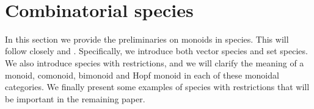 \documentclass[12pt, reqno]{amsart}
\theoremstyle{definition}
\newcommand{\oPi}{\mathbf{C}}
\newcommand{\opi}{\vec{\boldsymbol{\pi}}}
\begin{document}
%
%
%
%
%
%
%
%
%
%
%



\
\section{Combinatorial species\label{sec:species}}


In this section we provide the preliminaries on monoids in species.
This will follow closely \cite{AM2010} and \cite{Schmitt1993}.
Specifically, we introduce both vector species and set species.
We also introduce species with restrictions, and we will clarify the meaning of a monoid, comonoid, bimonoid and Hopf monoid in each of these monoidal categories.
We finally present some examples of species with restrictions that will be important in the remaining paper.
\end{document}
